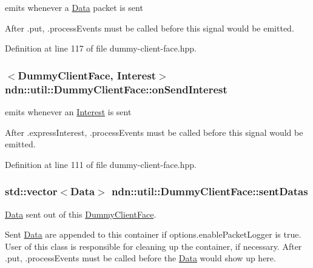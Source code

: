 emits whenever a \hyperlink{classndn_1_1Data}{Data} packet is sent 

After .put, .process\+Events must be called before this signal would be emitted. 

Definition at line 117 of file dummy-\/client-\/face.\+hpp.

\subsubsection[{\texorpdfstring{on\+Send\+Interest}{onSendInterest}}]{$<${\bf Dummy\+Client\+Face}, {\bf Interest}$>$ ndn\+::util\+::\+Dummy\+Client\+Face\+::on\+Send\+Interest}\hypertarget{classndn_1_1util_1_1DummyClientFace_a1c28a5ebe1a4164c8f3f73584ef68d92}{}\label{classndn_1_1util_1_1DummyClientFace_a1c28a5ebe1a4164c8f3f73584ef68d92}


emits whenever an \hyperlink{classndn_1_1Interest}{Interest} is sent 

After .express\+Interest, .process\+Events must be called before this signal would be emitted. 

Definition at line 111 of file dummy-\/client-\/face.\+hpp.

\subsubsection[{\texorpdfstring{sent\+Datas}{sentDatas}}]{\setlength{\rightskip}{0pt plus 5cm}std\+::vector$<${\bf Data}$>$ ndn\+::util\+::\+Dummy\+Client\+Face\+::sent\+Datas}\hypertarget{classndn_1_1util_1_1DummyClientFace_a34a36f52fa4a5c1380747eb0ff660c9f}{}\label{classndn_1_1util_1_1DummyClientFace_a34a36f52fa4a5c1380747eb0ff660c9f}


\hyperlink{classndn_1_1Data}{Data} sent out of this \hyperlink{classndn_1_1util_1_1DummyClientFace}{Dummy\+Client\+Face}. 

Sent \hyperlink{classndn_1_1Data}{Data} are appended to this container if options.\+enable\+Packet\+Logger is true. User of this class is responsible for cleaning up the container, if necessary. After .put, .process\+Events must be called before the \hyperlink{classndn_1_1Data}{Data} would show up here. 

